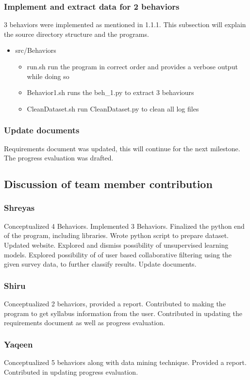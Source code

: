 \documentclass[12pt]{article}
\begin{document}
		\subsubsection{Implement and extract data for 2 behaviors}
		3 behaviors were implemented as mentioned in 1.1.1. This subsection will explain the source directory structure and the programs.
		\begin{itemize}
			\item src/Behaviors
			\begin{itemize}
				\item run.sh run the program in correct order and provides a verbose output while doing so
				\item Behavior1.sh runs the beh\_1.py to extract 3 behaviours
				\item CleanDataset.sh run CleanDataset.py to clean all log files
			\end{itemize}
		\end{itemize}
		\subsubsection{Update documents}
		Requirements document was updated, this will continue for the next milestone. The progress evaluation was drafted.
		
	\subsection{Discussion of team member contribution}
	\subsubsection{Shreyas}
		Conceptualized 4 Behaviors. Implemented 3 Behaviors. Finalized the python end of the program, including libraries. Wrote python script to prepare dataset. Updated website. Explored and dismiss possibility of unsupervised learning models. Explored possibility of of user based collaborative filtering using the given survey data, to further classify results. Update documents.
	\subsubsection{Shiru}
	Conceptualized 2 behaviors, provided a report. Contributed to making the program to get syllabus information from the user. Contributed in updating the requirements document as well as progress evaluation.
	\subsubsection{Yaqeen}
	Conceptualized 5 behaviors along with data mining technique. Provided a report. Contributed in updating progress evaluation. %
\end{document}
